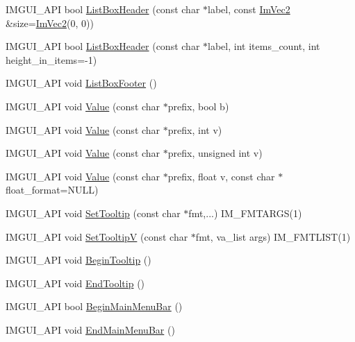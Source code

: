 \begin{DoxyCompactItemize}
\item 
I\+M\+G\+U\+I\+\_\+\+A\+PI bool \hyperlink{namespace_im_gui_a4003d6a6ab57f2fb43db80c6339a1aed}{List\+Box\+Header} (const char $\ast$label, const \hyperlink{struct_im_vec2}{Im\+Vec2} \&size=\hyperlink{struct_im_vec2}{Im\+Vec2}(0, 0))
\item 
I\+M\+G\+U\+I\+\_\+\+A\+PI bool \hyperlink{namespace_im_gui_a6c5c48e5e5b90365f3f6faaa3307af26}{List\+Box\+Header} (const char $\ast$label, int items\+\_\+count, int height\+\_\+in\+\_\+items=-\/1)
\item 
I\+M\+G\+U\+I\+\_\+\+A\+PI void \hyperlink{namespace_im_gui_a9a0a8f6a4a67280dce7bd91310a83a03}{List\+Box\+Footer} ()
\item 
I\+M\+G\+U\+I\+\_\+\+A\+PI void \hyperlink{namespace_im_gui_a1b3324308e43eeded5c3599fa0f03e85}{Value} (const char $\ast$prefix, bool b)
\item 
I\+M\+G\+U\+I\+\_\+\+A\+PI void \hyperlink{namespace_im_gui_a654ceb70f2dd1598f88861f54764ee08}{Value} (const char $\ast$prefix, int v)
\item 
I\+M\+G\+U\+I\+\_\+\+A\+PI void \hyperlink{namespace_im_gui_aec80a3e35bf7c1ff5704334e5a3ebd5a}{Value} (const char $\ast$prefix, unsigned int v)
\item 
I\+M\+G\+U\+I\+\_\+\+A\+PI void \hyperlink{namespace_im_gui_a0c8b87438082a1d0a46ae2a76090ca16}{Value} (const char $\ast$prefix, float v, const char $\ast$float\+\_\+format=N\+U\+LL)
\item 
I\+M\+G\+U\+I\+\_\+\+A\+PI void \hyperlink{namespace_im_gui_a313073fa01b8a9791f241ef93091ce92}{Set\+Tooltip} (const char $\ast$fmt,...) I\+M\+\_\+\+F\+M\+T\+A\+R\+GS(1)
\item 
I\+M\+G\+U\+I\+\_\+\+A\+PI void \hyperlink{namespace_im_gui_a3826acf68fc4a12bb66401575f51d6a2}{Set\+TooltipV} (const char $\ast$fmt, va\+\_\+list args) I\+M\+\_\+\+F\+M\+T\+L\+I\+ST(1)
\item 
I\+M\+G\+U\+I\+\_\+\+A\+PI void \hyperlink{namespace_im_gui_a36816a48385f4759d746a03cf6202512}{Begin\+Tooltip} ()
\item 
I\+M\+G\+U\+I\+\_\+\+A\+PI void \hyperlink{namespace_im_gui_ac8d75c160cfdf43d512f773ca133a1c6}{End\+Tooltip} ()
\item 
I\+M\+G\+U\+I\+\_\+\+A\+PI bool \hyperlink{namespace_im_gui_a55cb9cfb9865204ac6fb21c965784f78}{Begin\+Main\+Menu\+Bar} ()
\item 
I\+M\+G\+U\+I\+\_\+\+A\+PI void \hyperlink{namespace_im_gui_ab92f330c808546b340eb7bdf7e5f7c95}{End\+Main\+Menu\+Bar} ()
\item 

\end{DoxyCompactItemize}
